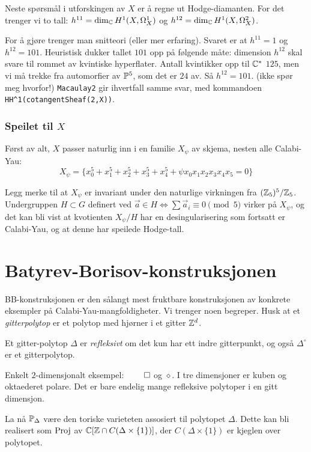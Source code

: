 \documentclass[11pt, norsk]{article}
\begin{document}
Neste spørsmål i utforskingen av $X$ er å regne ut Hodge-diamanten. For det trenger vi to tall: $h^{11}=\dim_{\mathbb{C}} H^1(X,\Omega^1_X)$ og $h^{12}=\dim_{\mathbb{C}} H^1(X, \Omega^2_X)$.

For å gjøre trenger man snitteori (eller mer erfaring). Svaret er at $h^{11}=1$ og $h^{12}=101$. Heuristisk dukker tallet $101$ opp på følgende måte: dimension $h^{12}$ skal svare til rommet av kvintiske hyperflater. Antall kvintikker opp til $\mathbb{C}^\ast$ $125$, men vi må trekke fra automorfier av $\mathbb{P}^5$, som det er $24$ av. Så $h^{12}=101$. (ikke spør meg hvorfor!) \verb|Macaulay2| gir ihvertfall samme svar, med kommandoen \verb|HH^1(cotangentSheaf(2,X))|.

\subsubsection{Speilet til $X$}

Først av alt, $X$ passer naturlig inn i en familie $X_\psi$ av skjema, nesten alle Calabi-Yau:
\[
X_\psi = \{ x_0^5+x_1^5+x_2^5+x_3^5+x_4^5+\psi x_0x_1x_2x_3x_4x_5=0 \}
\]

Legg merke til at $X_\psi$ er invariant under den naturlige virkningen fra $(\mathbb{Z}_5)^5/\mathbb{Z}_5$. Undergruppen $H \subset G$ definert ved $\vec a \in H \Leftrightarrow \sum \vec a_i \equiv 0 \pmod 5$ virker på $X_\psi$, og det kan bli vist at kvotienten $X_\psi/H$ har en desingularisering som fortsatt er Calabi-Yau, og at denne har speilede Hodge-tall.

\section{Batyrev-Borisov-konstruksjonen}

BB-konstruksjonen er den sålangt mest fruktbare konstruksjonen av konkrete eksempler på Calabi-Yau-mangfoldigheter. Vi trenger noen begreper. Husk at et \emph{gitterpolytop} er et polytop med hjørner i et gitter $\mathbb{Z}^d$. 

\begin{defi}
Et gitter-polytop $\Delta$ er \emph{refleksivt} om det kun har ett indre gitterpunkt, og også $\Delta^\circ$ er et gitterpolytop. 
\end{defi}

Enkelt $2$-dimensjonalt eksempel: $\qed$ og $\diamond$. I tre dimensjoner er kuben og oktaederet polare. Det er bare endelig mange refleksive polytoper i en gitt dimensjon. 

La nå $\mathbb{P}_\Delta$ være den toriske varieteten assosiert til polytopet $\Delta$. Dette kan bli realisert som $\operatorname{Proj}$ av $\mathbb{C}[\mathbb{Z} \cap C(\Delta \times \{ 1 \})]$, der $C(\Delta \times \{ 1 \})$ er kjeglen over polytopet. 
\end{document}
